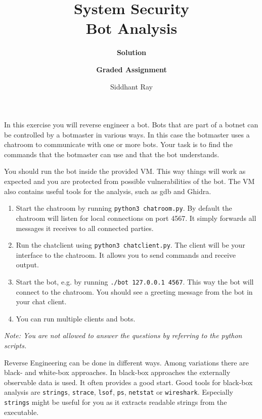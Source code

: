 \documentclass[a4paper,11pt]{article}
\title{System Security\\
Bot Analysis}
\author{\bf Solution}
\author{\bf Graded Assignment}
\author{Siddhant Ray }
\begin{document}
\maketitle

In this exercise you will reverse engineer a bot. Bots that are part of a botnet
can be controlled by a botmaster in various ways. In this case the botmaster
uses a chatroom to communicate with one or more bots. Your task is to find the
commands that the botmaster can use and that the bot understands. 

You should run the bot inside the provided VM. This way things will
work as expected and you are protected from possible vulnerabilities of the bot. The VM also contains useful tools for the analysis, such as gdb and Ghidra.

\begin{enumerate}
\item Start the chatroom by running \verb|python3 chatroom.py|. By
default the chatroom will listen for local connections on port 4567. It simply
forwards all messages it receives to all connected parties.
\item Run the chatclient using \verb|python3 chatclient.py|. The client will
be your interface to the chatroom. It allows you to send commands and receive
output.
\item Start the bot, e.g. by running \verb|./bot 127.0.0.1 4567|. This way the
bot will connect to the chatroom. You should see a greeting message from the bot
in your chat client.
\item You can run multiple clients and bots.
\end{enumerate}

\noindent\emph{Note: You are not allowed to answer the questions by referring to the python scripts.}

Reverse Engineering can be done in different ways. Among variations there are
black- and white-box approaches. In black-box approaches the externally
observable data is used. It often provides a good start. Good tools for
black-box analysis are \texttt{strings}, \texttt{strace}, \texttt{lsof},
\texttt{ps}, \texttt{netstat} or \texttt{wireshark}. Especially \texttt{strings}
might be useful for you as it extracts readable strings from the executable.
\end{document}
